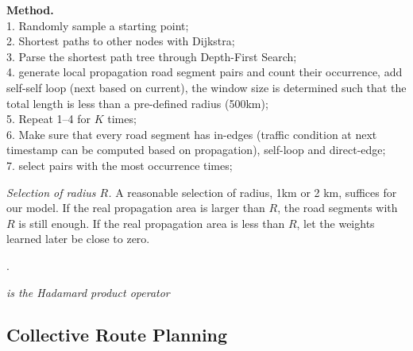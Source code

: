 {\bf Method.} \\
1. Randomly sample a starting point; \\
2. Shortest paths to other nodes with Dijkstra; \\
3. Parse the shortest path tree through Depth-First Search; \\
4. generate local propagation road segment pairs and count their occurrence, add self-self loop (next based on current), the window size is determined such that the total length is less than a pre-defined radius (500km); \\
5. Repeat 1--4 for $K$ times; \\
6. Make sure that every road segment has in-edges (traffic condition at next timestamp can be computed based on propagation), self-loop and direct-edge; \\
7. select pairs with the most occurrence times;

{\em Selection of radius $R$.} A reasonable selection of radius, \eg 1km or 2 km, suffices for our model. If the real propagation area is larger than $R$, the road segments with $R$ is still enough. If the real propagation area is less than $R$, let the weights learned later be close to zero.

.


{\em is the Hadamard product operator}

\subsection{Collective Route Planning}
\label{subsec-route}

